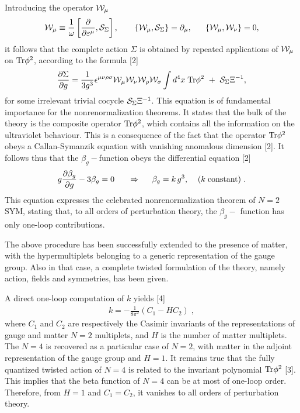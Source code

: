 \documentclass[a4paper,a4paper]{article}
\begin{document}
Introducing the operator ${\cal W}_\mu $
\begin{eqnarray}
{\cal W}_\mu \equiv \frac 1\omega \left[ \frac \partial {\partial \varepsilon ^\mu
},{\cal S}_\Sigma \right], \;\;\;\;\;\;\ 
\left\{ {\cal W}_\mu ,{\cal S}_\Sigma \right\} =\partial _\mu
,\;\;\;\;\;\;\left\{ {\cal W}_\mu ,{\cal W}_\nu \right\} =0,  \nonumber
\end{eqnarray}
it follows  that the complete action $\Sigma $ is obtained by repeated applications of $%
{\cal W}_\mu $ on ${\rm Tr}\phi ^2$, according to the formula [2]
\begin{eqnarray}
\frac{\partial \Sigma }{\partial g}=\frac 1{3g^3}\epsilon ^{\mu \nu \rho
\sigma }{\cal W}_\mu {\cal W}_\nu {\cal W}_\rho {\cal W}_\sigma \int d^4x%
\;{\rm Tr} \phi ^2 \;\;{\rm +}\;\;{\cal S}_\Sigma \Xi ^{-1}{\rm ,}
\nonumber
\end{eqnarray}
for some irrelevant trivial cocycle ${\cal S}_\Sigma \Xi ^{-1}$. This
equation is of fundamental importance for the nonrenormalization theorems. It states that 
the bulk of the theory is the
composite operator ${\rm Tr}\phi ^2$, which  contains all the
information on the ultraviolet behaviour. This is a consequence of the fact that the operator ${\rm Tr}\phi ^2$ obeys 
a Callan-Symanzik equation with vanishing anomalous
dimension [2].
It follows thus that the $\beta _g-$function obeys the 
differential equation [2] 
\begin{eqnarray}
 g\frac{\partial \beta _g}{\partial g}- 3\beta _g=0\; \;\;\;\;\; \Rightarrow  \;\;\;\;\;
\beta _g={k\,}g^3,\;\;\;\;({k\; \rm constant)\;.} \nonumber 
\end{eqnarray}
This equation expresses the celebrated nonrenormalization theorem of $N=2$
SYM, stating that, to all orders of perturbation theory, the $\beta _g-$%
function has only one-loop contributions.

The above procedure has been successfully extended to the presence of matter, with the hypermultiplets belonging to a generic representation  of the gauge group. Also in that case, a complete twisted formulation of the theory, namely action, fields and symmetries, has been given. 

A direct one-loop computation of $k$ yields [4] 
\begin{eqnarray}
k=-\frac{1}{8\pi ^2}\left( C_1-H C_2\right) \;, \nonumber
\end{eqnarray}
where $C_1$ and $C_2$ are respectively the Casimir invariants of the
representations of gauge and matter $N=2$ multiplets, and $H$ is the number
of matter multiplets.  The $N=4$ is recovered as a particular case of $N=2$, with matter in the adjoint representation of the gauge group and $H=1$. It remains true that the fully quantized 
twisted action of $N=4$ is related to the invariant polynomial $\rm{Tr }\phi^2$ [3]. This implies that the beta function of $N=4$ can be at most of one-loop order. Therefore, from $H=1$ and $C_1=C_2$, it vanishes to all orders of perturbation theory.
 
\end{document}
